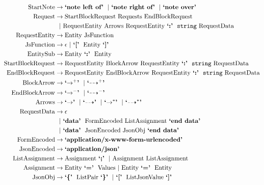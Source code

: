 \documentclass[11pt]{article}
\begin{document}
\begin{align*}
\nt{StartNote} &  \rightarrow \terminal{note left of}\ \opt \terminal{note right of}\ \opt \terminal{note over}\\
\nt{Request} & \rightarrow \nt{StartBlockRequest}\ \nt{Requests}\ \nt{EndBlockRequest}\\
        &\ \ \opt \nt{RequestEntity}\ \nt{Arrows}\ \nt{RequestEntity}\ \terminal{:}\ \str \nt{RequestData}\\
\nt{RequestEntity} & \rightarrow \nt{Entity}\ \nt{JsFunction}\\
\nt{JsFunction} & \rightarrow \epsilon\ \opt \terminal{[}\ \nt{Entity}\ \terminal{]}\\
\nt{EntitySub} & \rightarrow \nt{Entity}\ \terminal{:}\ \nt{Entity}\\
\nt{StartBlockRequest} & \rightarrow \nt{RequestEntity}\ \nt{BlockArrow}\ \nt{RequestEntity}\ \terminal{:}\ \str \nt{RequestData}\\
\nt{EndBlockRequest} & \rightarrow \nt{RequestEntity}\ \nt{EndBlockArrow}\ \nt{RequestEntity}\ \terminal{:}\ \str \nt{RequestData}\\
\nt{BlockArrow} & \rightarrow \terminal{$\rightarrow^+$}\ \opt \terminal{$\dashrightarrow^+$}\\
\nt{EndBlockArrow} & \rightarrow \terminal{$\rightarrow^-$}\ \opt \terminal{$\dashrightarrow^-$}\\
\nt{Arrows} & \rightarrow \terminal{$\rightarrow$}\ \opt \terminal{$\dashrightarrow$}\ \opt \terminal{$\rightarrow^*$}\ \opt \terminal{$\dashrightarrow^*$}\\
\nt{RequestData}  & \rightarrow  \epsilon\\
				&\ \ \opt \terminal{data}\ \nt{FormEncoded}\ \nt{ListAssignment}\ \terminal{end data}\\
			   &\ \ \opt \terminal{data}\ \nt{JsonEncoded}\ \nt{JsonObj}\ \terminal{end data}\\
\nt{FormEncoded} & \rightarrow \terminal{application/x-www-form-urlencoded}\\
\nt{JsonEncoded} & \rightarrow \terminal{application/json}\\
\nt{ListAssignment} & \rightarrow \nt{Assignment}\ \terminal{;}\ \opt \nt{Assignment}\ \nt{ListAssignment}\\
\nt{Assignment} & \rightarrow \nt{Entity}\ \terminal{=}\ \nt{Values}\ \opt \nt{Entity}\ \terminal{=}\ \nt{Entity}\\
\nt{JsonObj} & \rightarrow \terminal{\{}\ \nt{ListPair}\ \terminal{\}}\ \opt \terminal{[}\ \nt{ListJsonValue}\ \terminal{]}\\

\end{align*}
\end{document}
